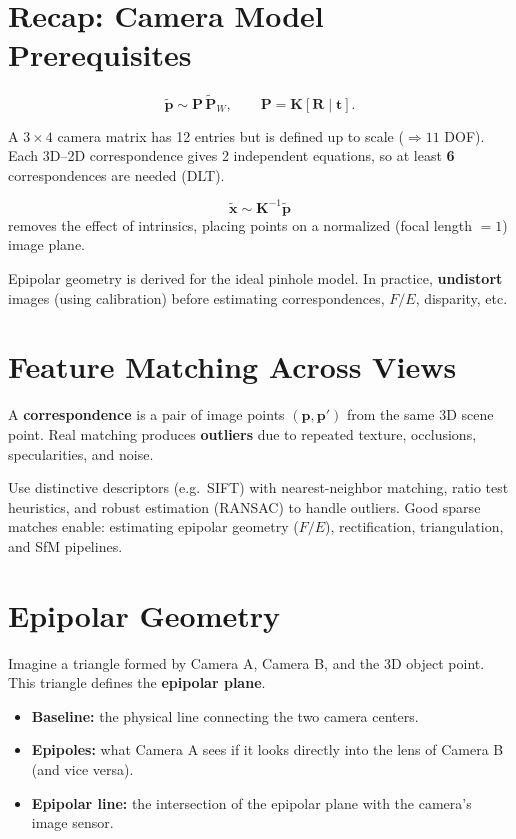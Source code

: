 \documentclass[11pt, oneside]{book}
\newcommand{\vct}[1]{\bm{#1}}           %
\newcommand{\mat}[1]{\mathbf{#1}}       %
\begin{document}
\section{Recap: Camera Model Prerequisites}

\begin{thmbox}[title={Pinhole Camera Model}]
\[
\tilde{\vct{p}} \sim \mat{P}\,\tilde{\vct{P}}_W,
\qquad
\mat{P}=\mat{K}[\mat{R}\mid \vct{t}].
\]
\end{thmbox}

A $3\times 4$ camera matrix has 12 entries but is defined up to scale ($\Rightarrow 11$ DOF).
Each 3D--2D correspondence gives 2 independent equations, so at least \textbf{6} correspondences are needed (DLT).

\begin{defbox}[title={Normalized Image Coordinates}]
\[
\tilde{\vct{x}} \sim \mat{K}^{-1}\tilde{\vct{p}}
\]
removes the effect of intrinsics, placing points on a normalized (focal length $=1$) image plane.
\end{defbox}

Epipolar geometry is derived for the ideal pinhole model. In practice, \textbf{undistort} images (using calibration)
before estimating correspondences, $F/E$, disparity, etc.

\section{Feature Matching Across Views}

\begin{defbox}[title={Correspondences}]
A \textbf{correspondence} is a pair of image points $(\vct{p},\vct{p}')$ from the same 3D scene point.
Real matching produces \textbf{outliers} due to repeated texture, occlusions, specularities, and noise.
\end{defbox}

Use distinctive descriptors (e.g.\ SIFT) with nearest-neighbor matching, ratio test heuristics,
and robust estimation (RANSAC) to handle outliers.
Good sparse matches enable: estimating epipolar geometry ($F/E$), rectification, triangulation, and SfM pipelines.

\section{Epipolar Geometry}

\begin{defbox}[title={Epipolar Geometry}]
Imagine a triangle formed by Camera A, Camera B, and the 3D object point. This triangle defines the \textbf{epipolar plane}.
\begin{itemize}
  \item \textbf{Baseline:} the physical line connecting the two camera centers.
  \item \textbf{Epipoles:} what Camera A sees if it looks directly into the lens of Camera B (and vice versa).
  \item \textbf{Epipolar line:} the intersection of the epipolar plane with the camera's image sensor.
\end{itemize}
\end{defbox}
\end{document}
